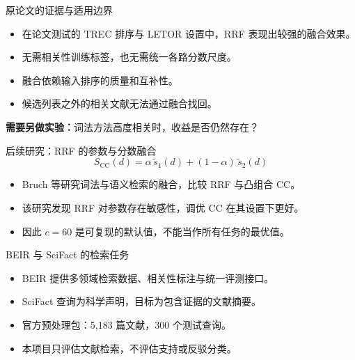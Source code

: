 \documentclass[aspectratio=169,11pt]{beamer}
\begin{document}
\begin{frame}{原论文的证据与适用边界}
\begin{itemize}\setlength\itemsep{0.85em}
\item 在论文测试的 TREC 排序与 LETOR 设置中，RRF 表现出较强的融合效果。
\item 无需相关性训练标签，也无需统一各路分数尺度。
\item 融合依赖输入排序的质量和互补性。
\item 候选列表之外的相关文献无法通过融合找回。
\end{itemize}
\vfill
\textbf{需要另做实验：}词法方法高度相关时，收益是否仍然存在？
\end{frame}

\begin{frame}{后续研究：RRF 的参数与分数融合}
\[
 S_{\mathrm{CC}}(d)=\alpha\,\widetilde{s}_1(d)+(1-\alpha)\,\widetilde{s}_2(d)
\]
\begin{itemize}\setlength\itemsep{0.65em}
\item Bruch 等研究词法与语义检索的融合，比较 RRF 与凸组合 CC。
\item 该研究发现 RRF 对参数存在敏感性，调优 CC 在其设置下更好。
\item 因此 $c=60$ 是可复现的默认值，不能当作所有任务的最优值。
\end{itemize}
\end{frame}

\begin{frame}{BEIR 与 SciFact 的检索任务}
\begin{itemize}\setlength\itemsep{0.8em}
\item BEIR 提供多领域检索数据、相关性标注与统一评测接口。
\item SciFact 查询为科学声明，目标为包含证据的文献摘要。
\item 官方预处理包：5,183 篇文献，300 个测试查询。
\item 本项目只评估文献检索，不评估支持或反驳分类。
\end{itemize}
\end{frame}
\end{document}
